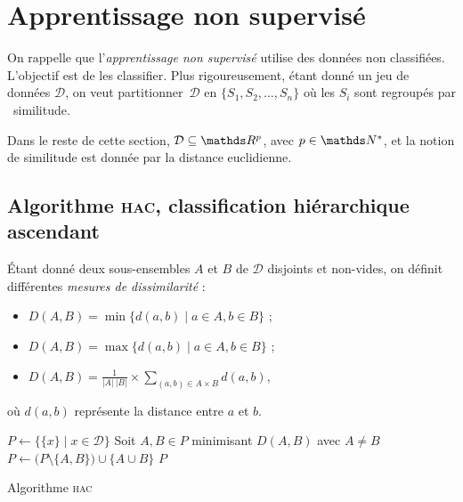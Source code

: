 \section{Apprentissage non supervisé}

On rappelle que l'\textit{apprentissage non supervisé} utilise des données non classifiées. L'objectif est de les classifier. Plus rigoureusement, étant donné un jeu de données $\mathcal{D}$, on veut partitionner~$\mathcal{D}$\/ en $\{S_1, S_2, \ldots, S_n\}$\/ où les $S_i$\/ sont regroupés par \guillemotleft~similitude.~\guillemotright

\begin{rmk}
	Dans le reste de cette section, $\mathcal{D} \subseteq \R^p$, avec $p \in \N^*$, et la notion de similitude est donnée par la distance euclidienne.
\end{rmk}

\subsection{Algorithme \textsc{hac}, classification hiérarchique ascendant}

\begin{defn}
	Étant donné deux sous-ensembles $A$\/ et $B$\/ de $\mathcal{D}$\/ disjoints et non-vides, on définit différentes \textit{mesures de dissimilarité} :
	\begin{itemize}
		\item $D(A,B) = \min \{d(a,b)  \mid a \in A, b \in B\}$\/ ;
		\item $D(A,B) = \max \{d(a,b)  \mid a \in A, b \in B\}$\/ ;
		\item $D(A,B) = \frac{1}{|A|\:|B|} \times \sum_{(a,b) \in A \times B} d(a,b)$,
	\end{itemize}
	où $d(a,b)$\/ représente la distance entre $a$\/ et $b$.
\end{defn}

\begin{algorithm}[H]
	\centering
	\begin{algorithmic}[1]
		\State $P \gets \big\{ \{x\}  \mid x \in \mathcal{D} \big\}$
		\State Soit $A,B \in P$ minimisant $D(A,B)$\/ avec $A \neq B$\/ 
		\State $P \gets \big(P \setminus \{A,B\}\big) \cup \{A \cup B\}$\/
		\EndWhile
		\State\Return $P$
	\end{algorithmic}
	\caption{Algorithme \textsc{hac}}
\end{algorithm}

